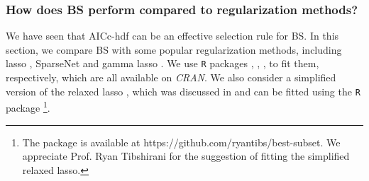 \subsubsection{How does BS perform compared to regularization methods?}
\label{sec:bs_regu}
We have seen that AICc-hdf can be an effective selection rule for BS. In this section, we compare BS with some popular regularization methods, including lasso \citep{Tibshirani1996}, SparseNet \citep{Mazumder2011} and gamma lasso \citep{Taddy2017}. We use {\tt{R}} packages  \citep{Friedman2010},  \citep{Mazumder2011},  \citep{Taddy2017}, to fit them, respectively, which are all available on \textit{CRAN}. We also consider a simplified version of the relaxed lasso \citep{Meinshausen2007}, which was discussed in \citet{Hastie2017} and can be fitted using the {\tt{R}} package \footnote{The package is available at https://github.com/ryantibs/best-subset. We appreciate Prof. Ryan Tibshirani for the suggestion of fitting the simplified relaxed lasso.}.

